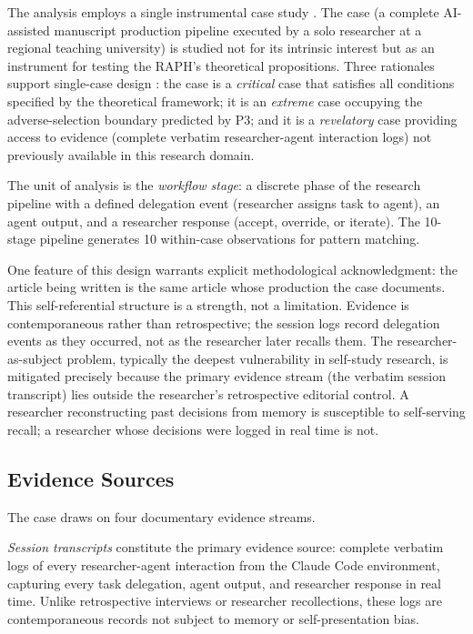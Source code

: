 \documentclass[12pt]{article}
\begin{document}
The analysis employs a single instrumental case study \citep{stake1995art, yin2014case}. The case
(a complete AI-assisted manuscript production pipeline executed by a solo researcher at a
regional teaching university) is studied not for its intrinsic interest but as an instrument
for testing the RAPH's theoretical propositions. Three rationales support single-case design
\citep{yin2014case}: the case is a \emph{critical} case that satisfies all conditions
specified by the theoretical framework; it is an \emph{extreme} case occupying the
adverse-selection boundary predicted by P3; and it is a \emph{revelatory} case providing
access to evidence (complete verbatim researcher-agent interaction logs) not previously
available in this research domain.

The unit of analysis is the \emph{workflow stage}: a discrete phase of the research
pipeline with a defined delegation event (researcher assigns task to agent), an agent
output, and a researcher response (accept, override, or iterate). The 10-stage pipeline
generates 10 within-case observations for pattern matching.

One feature of this design warrants explicit methodological acknowledgment: the article
being written is the same article whose production the case documents. This self-referential
structure is a strength, not a limitation. Evidence is contemporaneous rather than
retrospective; the session logs record delegation events as they occurred, not as the
researcher later recalls them. The researcher-as-subject problem, typically the deepest
vulnerability in self-study research, is mitigated precisely because the primary evidence
stream (the verbatim session transcript) lies outside the researcher's retrospective
editorial control. A researcher reconstructing past decisions from memory is susceptible
to self-serving recall; a researcher whose decisions were logged in real time is not.

\subsection{Evidence Sources}

The case draws on four documentary evidence streams.

\textit{Session transcripts} constitute the primary evidence source: complete verbatim logs
of every researcher-agent interaction from the Claude Code environment, capturing every
task delegation, agent output, and researcher response in real time. Unlike retrospective
interviews or researcher recollections, these logs are contemporaneous records not subject
to memory or self-presentation bias.
\end{document}
